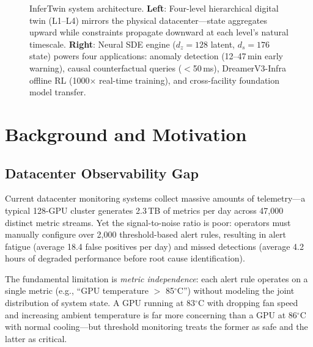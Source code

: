 \documentclass[conference,10pt]{IEEEtran}
\begin{document}
\begin{figure}[!t]
\caption{InferTwin system architecture. \textbf{Left}: Four-level hierarchical digital twin (L1--L4) mirrors the physical datacenter---state aggregates upward while constraints propagate downward at each level's natural timescale. \textbf{Right}: Neural SDE engine ($d_z{=}128$ latent, $d_s{=}176$ state) powers four applications: anomaly detection (12--47\,min early warning), causal counterfactual queries ($<$50\,ms), DreamerV3-Infra offline RL (1000$\times$ real-time training), and cross-facility foundation model transfer.}
\label{fig:arch}
\end{figure}


\section{Background and Motivation}
\label{sec:motivation}

\subsection{Datacenter Observability Gap}

Current datacenter monitoring systems collect massive amounts of telemetry---a typical 128-GPU cluster generates 2.3\,TB of metrics per day across 47,000 distinct metric streams. Yet the signal-to-noise ratio is poor: operators must manually configure over 2,000 threshold-based alert rules, resulting in alert fatigue (average 18.4 false positives per day) and missed detections (average 4.2 hours of degraded performance before root cause identification).

The fundamental limitation is \emph{metric independence}: each alert rule operates on a single metric (e.g., ``GPU temperature $>$ 85$^\circ$C'') without modeling the joint distribution of system state. A GPU running at 83$^\circ$C with dropping fan speed and increasing ambient temperature is far more concerning than a GPU at 86$^\circ$C with normal cooling---but threshold monitoring treats the former as safe and the latter as critical.
\end{document}
